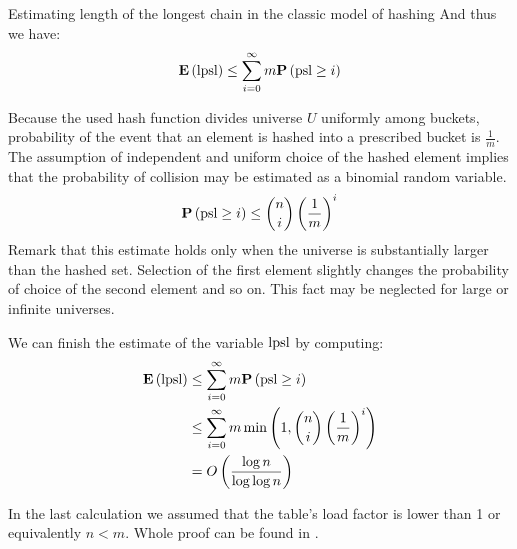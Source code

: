 \begin{section}{Estimating length of the longest chain in the classic model of hashing}
And thus we have:
\begin{displaymath}
\mathbf{E}\left(\mathrm{lpsl}\right) \leq \displaystyle \sum_{i = 0}^{\infty} m \mathbf{P}\left(\mathrm{psl} \geq i\right)
\end{displaymath}

Because the used hash function divides universe $U$ uniformly among buckets, probability of the event that an element is hashed into a prescribed bucket is $\frac{1}{m}$. The assumption of independent and uniform choice of the hashed element implies that the probability of collision may be estimated as a binomial random variable. 
\begin{displaymath}
\mathbf{P}\left(\mathrm{psl} \geq i\right) \leq \dbinom{n}{i}\left(\frac{1}{m}\right)^i
\end{displaymath}
Remark that this estimate holds only when the universe is substantially larger than the hashed set. Selection of the first element slightly changes the probability of choice of the second element and so on. This fact may be neglected for large or infinite universes.

We can finish the estimate of the variable $\mathrm{lpsl}$ by computing:
\begin{displaymath}
\begin{split}
\mathbf{E}\left(\mathrm{lpsl}\right)	& \leq \displaystyle \sum_{i = 0}^{\infty} m \mathbf{P}\left(\mathrm{psl} \geq i\right) \\
		& \leq \displaystyle \sum_{i = 0}^{\infty} m \min\left(1, \dbinom{n}{i}\left(\frac{1}{m}\right)^i\right) \\
		& = O\left(\frac{\log n}{\log \log n}\right)
\end{split}
\end{displaymath}

In the last calculation we assumed that the table's load factor is lower than 1 or equivalently $n < m$. Whole proof can be found in \cite{DBLP:books/sp/Mehlhorn84}.
\end{section}

